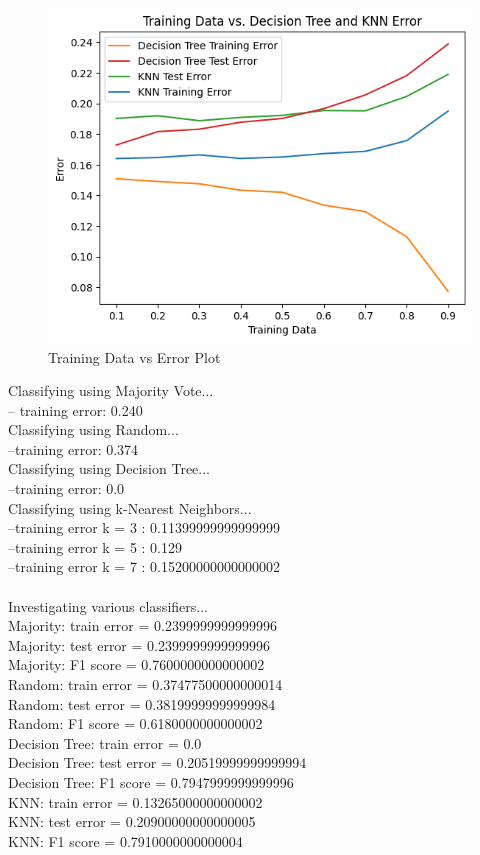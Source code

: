 \documentclass[10pt]{article}
\begin{document}
\begin{flushleft}
\begin{figure}[H]
\centering
\includegraphics[width=1\textwidth]{images/train_data_vs_tree&knn.png}
\caption{Training Data vs Error Plot}
\label{fig:Training}
\end{figure}


Classifying using Majority Vote... \\
	-- training error: 0.240 \\
Classifying using Random... \\
	--training error: 0.374 \\
Classifying using Decision Tree... \\
	--training error: 0.0 \\
Classifying using k-Nearest Neighbors... \\
	--training error k = 3 : 0.11399999999999999 \\
	--training error k = 5 : 0.129 \\
	--training error k = 7 : 0.15200000000000002 \\
 \\

Investigating various classifiers... \\
Majority:	 train error =	 0.2399999999999996 \\
Majority:	 test error =	 0.2399999999999996 \\
Majority:	 F1 score =	 0.7600000000000002 \\
Random:		 train error =	 0.37477500000000014 \\
Random:		 test error =	 0.38199999999999984 \\
Random:		 F1 score =	 0.6180000000000002 \\
Decision Tree:	 train error =	 0.0 \\
Decision Tree:	 test error =	 0.20519999999999994 \\
Decision Tree:	 F1 score =	 0.7947999999999996 \\ 
KNN:		 train error =	 0.13265000000000002 \\ 
KNN:		 test error =	 0.20900000000000005 \\ 
KNN:		 F1 score =	 0.7910000000000004 \\


\end{flushleft}
\end{document}

